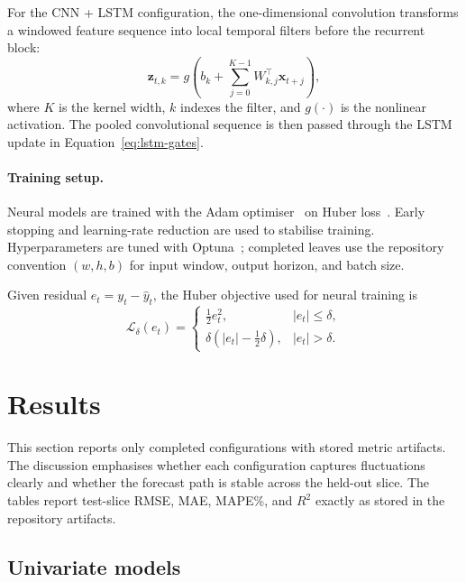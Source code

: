 \documentclass[11pt,a4paper]{article}
\begin{document}
For the CNN + LSTM configuration, the one-dimensional convolution transforms a windowed feature sequence into local temporal filters before the recurrent block:
\begin{equation}
\mathbf{z}_{t,k} = g\!\left(b_k+\sum_{j=0}^{K-1} W_{k,j}^{\top}\mathbf{x}_{t+j}\right),
\label{eq:conv1d}
\end{equation}
where $K$ is the kernel width, $k$ indexes the filter, and $g(\cdot)$ is the nonlinear activation. The pooled convolutional sequence is then passed through the LSTM update in Equation~\eqref{eq:lstm-gates}.

\paragraph{Training setup.} Neural models are trained with the Adam optimiser~\citep{kingma2015adam} on Huber loss~\citep{huber1964robust}. Early stopping and learning-rate reduction are used to stabilise training. Hyperparameters are tuned with Optuna~\citep{akiba2019optuna}; completed leaves use the repository convention $(w,h,b)$ for input window, output horizon, and batch size.

Given residual $e_t=y_t-\hat{y}_t$, the Huber objective used for neural training is
\begin{equation}
\mathcal{L}_{\delta}(e_t)=
\begin{cases}
\frac{1}{2}e_t^2, & |e_t|\le \delta,\\
\delta\left(|e_t|-\frac{1}{2}\delta\right), & |e_t|>\delta.
\end{cases}
\label{eq:huber}
\end{equation}

\section{Results}\label{sec:results}

This section reports only completed configurations with stored metric artifacts. The discussion emphasises whether each configuration captures fluctuations clearly and whether the forecast path is stable across the held-out slice. The tables report test-slice RMSE, MAE, MAPE\%, and $R^2$ exactly as stored in the repository artifacts.

\subsection{Univariate models}\label{sec:res-uni}
\end{document}
